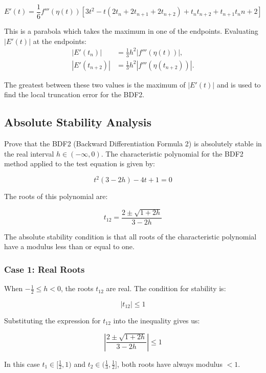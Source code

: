 \documentclass[a4paper,12pt]{article}
\begin{document}
\begin{equation}
E'(t)=\frac{1}{6}f'''(\eta(t))[3t^2 - t(2t_n + 2t_{n+1} + 2t_{n+2}) + t_nt_{n+2} + t_{n+1}t_n{n+2}]
\end{equation}

This is a parabola which takes the maximum in one of the endpoints.
Evaluating $|E'(t)|$ at the endpoints:
\begin{align*}
|E'(t_n)| &= \frac{1}{3}h^2|f'''(\eta(t))| , \\
|E'(t_{n+2})| &= \frac{1}{3}h^2|f'''(\eta(t_{n+2}))|.
\end{align*}

The greatest between these two values is the maximum of $|E'(t)|$ and is used to find the local truncation error for the BDF2. 


\subsection*{Absolute Stability Analysis}

Prove that the BDF2 (Backward Differentiation Formula 2) is absolutely stable in the real interval \( h \in (-\infty, 0) \). The characteristic polynomial for the BDF2 method applied to the test equation is given by:

\begin{equation}
t^2(3 - 2h) - 4t + 1 = 0
\end{equation}

The roots of this polynomial are:

\[
t_{12} = \frac{2 \pm \sqrt{1 + 2h}}{3 - 2h}
\]

The absolute stability condition is that all roots of the characteristic polynomial have a modulus less than or equal to one.

\subsubsection*{Case 1: Real Roots}

When \( -\frac{1}{2} \leq h < 0 \), the roots \( t_{12} \) are real. The condition for stability is:

\[
|t_{12}| \leq 1
\]

Substituting the expression for \( t_{12} \) into the inequality gives us:

\[
\left| \frac{2 \pm \sqrt{1 + 2h}}{3 - 2h} \right| \leq 1
\]

In this case $t_1 \in [\frac{1}{2},1)$ and $t_2 \in (\frac{1}{3},\frac{1}{2}] $, both roots have always modulus $<1$.
\end{document}
